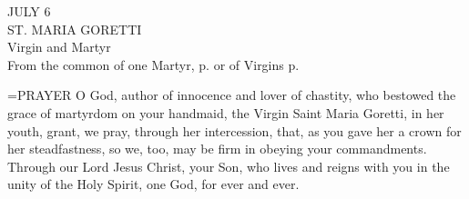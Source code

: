\begin{center}\normalsize JULY 6\\
\footnotesize ST. MARIA GORETTI\\
\footnotesize Virgin and Martyr\\
\footnotesize From the common of one Martyr, p.    or of Virgins p. \\
\end{center}

\hangindent=\parindent \small{PRAYER 
O God, author of innocence and lover of chastity,
who bestowed the grace of martyrdom
on your handmaid, the Virgin Saint Maria Goretti, in her youth,
grant, we pray, through her intercession,
that, as you gave her a crown for her steadfastness,
so we, too, may be firm
in obeying your commandments.
Through our Lord Jesus Christ, your Son,
who lives and reigns with you in the unity of the Holy Spirit,
one God, for ever and ever.\\}
 
